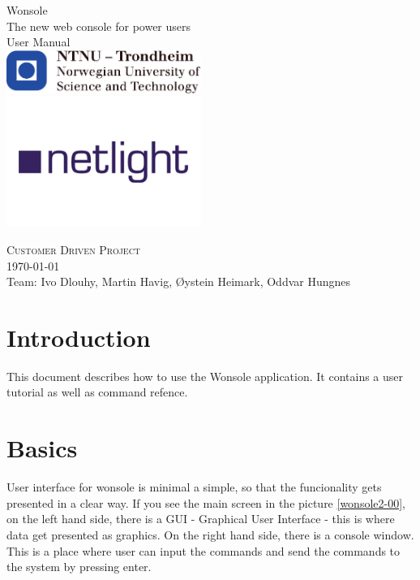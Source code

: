 \documentclass[10pt,a4paper,oneside]{report}
\begin{document}
\thispagestyle{empty}
\begin{center}
	{\Huge Wonsole} \\
	\medskip
	{\LARGE The new web console for power users} \\ 
	\bigskip
	{\Huge User Manual} \\ 
	\includegraphics[width=2.5in]{image/logo-ntnu.pdf} \\
	\includegraphics[width=2.5in]{image/logo-netlight.png}
\end{center}
{\Large \textsc{Customer Driven Project}} \\
{\large \today \\Team: Ivo Dlouhy, Martin Havig, Øystein Heimark, Oddvar Hungnes}
\newpage

\setcounter{tocdepth}{1}
\tableofcontents
\clearpage
\listoffigures


\chapter{Introduction}
This document describes how to use the Wonsole application. It contains a user
tutorial as well as command refence.

\chapter{Basics}
User interface for wonsole is minimal a simple, so that the funcionality gets
presented in a clear way. If you see the main screen in the
picture \ref{wonsole2-00}, on the left hand side, there is a GUI - Graphical
User Interface - this is where data get presented as graphics. On the right hand side, there is a console window. This is a place
where user can input the commands and send the commands to the system by
pressing enter.
\end{document}
